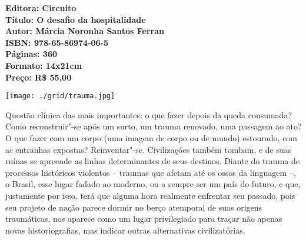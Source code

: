 
\vfill
\enlargethispage{\baselineskip}

\hspace*{-.4cm}\begin{minipage}[c]{1\linewidth}
\small\textbf{
\hspace*{-.1cm}Editora: Circuito\\
Título: O desafio da hospitalidade\\
Autor: Márcia Noronha Santos Ferran\\ 
ISBN: 978-65-86974-06-5\\
Páginas: 360\\
Formato: 14x21cm\\
Preço: R\$ 55,00\\
}
\end{minipage}



\pagebreak %


\begin{center}
\hspace*{.5cm}\texttt{[image: ./grid/trauma.jpg]}
\end{center}

\hspace*{-7cm}\hrulefill\hspace*{-7cm}

\medskip

\noindent{}Questão clínica das mais importantes: o que fazer depois da queda
consumada? Como reconstruir"-se após um surto, um trauma
renovado, uma passagem ao ato? O que fazer com um corpo (uma imagem de corpo
ou de mundo) estourado, com as entranhas expostas?  Reinventar"-se.
Civilizações também tombam, e de suas ruínas se apreende
as linhas determinantes de seus destinos. Diante do trauma de
processos históricos violentos – traumas que afetam até os ossos da linguagem –, o
Brasil, esse lugar fadado ao moderno, ou a sempre ser um país do futuro, e que,
justamente por isso, terá que alguma hora realmente enfrentar seu passado, pois seu
projeto de nação parece dormir no berço atemporal de suas origens traumáticas, nos
aparece como um lugar privilegiado para traçar não apenas novas historiografias, mas
indicar outras alternativas civilizatórias.

